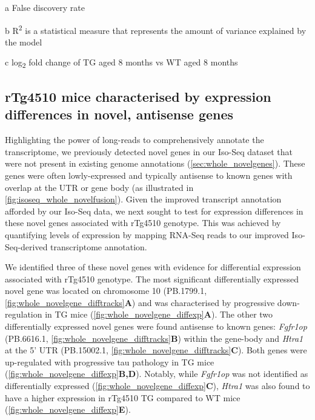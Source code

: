 \begin{table}[!htp]
\begin{threeparttable}
\begin{tabularx}{0.95\textwidth}{cccccccc}
	\end{tabularx}
	\begin{tablenotes}
	\footnotesize
	\item[a] False discovery rate
	\item[b] R\textsuperscript{2} is a statistical measure that represents the amount
	of variance explained by the model
	\item[c] log\textsubscript{2} fold change of TG aged 8 months vs WT aged 8 months
	\end{tablenotes}
	\end{threeparttable}
	\label{tab:dea_wholemouse}
\end{table}

\clearpage
\subsection{rTg4510 mice characterised by expression differences in novel, antisense genes}
Highlighting the power of long-reads to comprehensively annotate the transcriptome, we previously detected novel genes in our Iso-Seq dataset that were not present in existing genome annotations (\cref{sec:whole_novelgenes}). These genes were often lowly-expressed and typically antisense to known genes with overlap at the UTR or gene body (as illustrated in \cref{fig:isoseq_whole_novelfusion}). Given the improved transcript annotation afforded by our Iso-Seq data, we next sought to test for expression differences in these novel genes associated with rTg4510 genotype. This was achieved by quantifying levels of expression by mapping RNA-Seq reads to our improved Iso-Seq-derived transcriptome annotation. 

We identified three of these novel genes with evidence for differential expression associated with rTg4510 genotype. The most significant differentially expressed novel gene was located on chromosome 10 (PB.1799.1, \cref{fig:whole_novelgene_difftracks}\textbf{A}) and was characterised by progressive down-regulation in TG mice (\cref{fig:whole_novelgene_diffexp}\textbf{A}). The other two differentially expressed novel genes were found antisense to known genes: \textit{Fgfr1op} (PB.6616.1, \cref{fig:whole_novelgene_difftracks}\textbf{B}) within the gene-body and \textit{Htra1} at the 5' UTR (PB.15002.1, \cref{fig:whole_novelgene_difftracks}\textbf{C}). Both genes were up-regulated with progressive tau pathology in TG mice (\cref{fig:whole_novelgene_diffexp}\textbf{B,D}). Notably, while \textit{Fgfr1op} was not identified as differentially expressed (\cref{fig:whole_novelgene_diffexp}\textbf{C}), \textit{Htra1} was also found to have a higher expression in rTg4510 TG compared to WT mice (\cref{fig:whole_novelgene_diffexp}\textbf{E}).     

